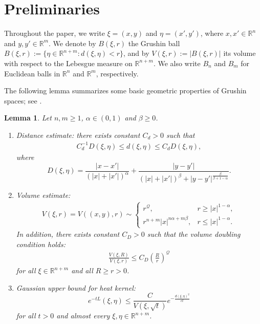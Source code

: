 \documentclass[12pt]{amsart}
\theoremstyle{plain}
\newtheorem{lemma}[theorem]{Lemma}
\theoremstyle{definition}
\numberwithin{equation}{section}
\begin{document}
\section{Preliminaries}

Throughout the paper, we write \(\xi=(x,y)\) and \(\eta=(x',y')\), where \(x,x'\in\mathbb R^n\) and \(y,y'\in\mathbb R^m\). We denote by \(B(\xi,r)\) the Grushin ball $B(\xi,r):=\{\eta\in\mathbb R^{n+m}: d(\xi,\eta)<r\}$, and by $V(\xi,r):=|B(\xi,r)|$ its volume with respect to the Lebesgue measure on \(\mathbb R^{n+m}\). We also write \(B_n\) and \(B_m\) for Euclidean balls in \(\mathbb R^n\) and \(\mathbb R^m\), respectively.

The following lemma summarizes some basic geometric properties of Grushin spaces; see \cite[Proposition~5.1, Theorem~6.4]{RS}.


\begin{lemma}\label{le_geo}
Let $n, m\ge 1$, $\alpha \in (0,1)$ and $\beta \ge 0$.

\begin{enumerate}
\item Distance estimate: there exists constant $C_d>0$ such that \begin{align}
   C_d^{-1} D(\xi,\eta) \le  d(\xi,\eta) \le C_d D(\xi,\eta),
\end{align}
where
\begin{equation*}
    D(\xi,\eta) = \frac{|x-x'|}{\left( |x| + |x'| \right)^\alpha} + \frac{|y-y'|}{(|x|+|x'|)^{\beta} + |y-y'|^{\frac{\beta}{\beta+1-\alpha}}}.
\end{equation*}
\item Volume estimate: \begin{align*}
    V(\xi,r) = V((x,y),r) \sim \begin{cases}
        r^{\mathcal{Q}}, & r\ge |x|^{1-\alpha},\\
        r^{n+m}|x|^{n \alpha + m\beta}, & r\le |x|^{1-\alpha}.
    \end{cases}
\end{align*}
In addition, there exists constant $C_D>0$ such that the volume doubling condition holds:
\begin{align*}
\frac{V(\xi, R)}{V(\xi,r)} \le C_D \left(\frac{R}{r}\right)^{\mathcal{Q}}
\end{align*}
for all $\xi \in \mathbb{R}^{n+m}$ and all $R\ge r>0$.
\item Gaussian upper bound for heat kernel: 
\begin{equation*}
    e^{-tL}(\xi,\eta) \le \frac{C}{V(\xi, \sqrt{t})} e^{-\frac{d(\xi,\eta)^2}{ct}}
\end{equation*}
for all $t>0$ and almost every $\xi,\eta \in \mathbb{R}^{n+m}$.
\end{enumerate}

\end{lemma}
\end{document}
